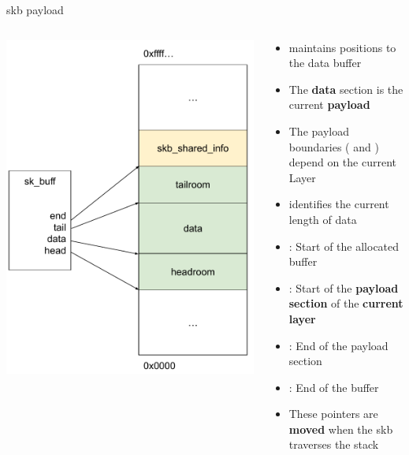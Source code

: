\begin{frame}{skb payload}
	\begin{columns}
		\begin{column}{0.3\textwidth}
			\includegraphics[width=\textwidth]{slides/networking-skb/skb.pdf}
		\end{column}
		\begin{column}{0.7\textwidth}
			\begin{itemize}
				\item {} maintains positions to the data buffer
				\item The \textbf{data} section is the current \textbf{payload}
				\item The payload boundaries ( and ) depend on the current Layer
				\item {} identifies the current length of data
				\item {} : Start of the allocated buffer
				\item {} : Start of the \textbf{payload section} of the \textbf{current layer}
				\item {} : End of the payload section
				\item {} : End of the buffer
				\item These pointers are \textbf{moved} when the skb traverses the stack
			\end{itemize}
		\end{column}
	\end{columns}
\end{frame}

